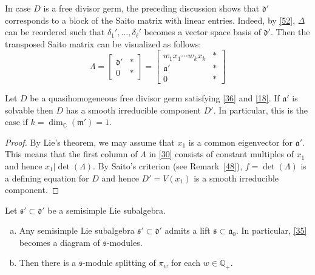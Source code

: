 In case $D$ is a free divisor germ, the preceding discussion shows that ${\mathfrak{d}}'$ corresponds to a block of the Saito matrix with linear entries.
Indeed, by \eqref{52}, $\Delta$ can be reordered such that $\delta_1',\dots,\delta_\ell'$ becomes a vector space basis of ${\mathfrak{d}}'$.
Then the transposed Saito matrix can be visualized as follows:
\begin{equation}\label{30}
\Lambda=
\left[
\begin{array}{c|c}
{\mathfrak{d}}' & * \\
\hline
0 & * 
\end{array}
\right]=
\left[
\begin{array}{c|c}
w_1x_1\cdots w_kx_k & * \\
\hline
{\mathfrak{a}}' & * \\
\hline
0 & * 
\end{array}
\right]
\end{equation}

\begin{prp}\label{31}
Let $D$ be a quasihomogeneous free divisor germ satisfying \eqref{36} and \eqref{18}.
If ${\mathfrak{a}}'$ is solvable then $D$ has a smooth irreducible component $D'$.
In particular, this is the case if $k=\dim_{\mathds{C}}({\mathfrak{m}}')=1$.
\end{prp}

\begin{proof}
By Lie's theorem, we may assume that $x_1$ is a common eigenvector for ${\mathfrak{a}}'$.
This means that the first column of $\Lambda$ in \eqref{30} consists of constant multiples of $x_1$ and hence $x_1\vert\det(\Lambda)$.
By Saito's criterion (see Remark~\ref{48}), $f=\det(\Lambda)$ is a defining equation for $D$ and hence $D'=V(x_1)$ is a smooth irreducible component.
\end{proof}

\begin{lem}\label{32}
Let ${\mathfrak{s}}'\subset{\mathfrak{d}}'$ be a semisimple Lie subalgebra.
\begin{enumerate}[(a)]
\item\label{32a}
Any semisimple Lie subalgebra ${\mathfrak{s}}'\subset{\mathfrak{d}}'$ admits a lift ${\mathfrak{s}}\subset{\mathfrak{a}}_0$.
In particular, \eqref{35} becomes a diagram of ${\mathfrak{s}}$-modules.
\item\label{32b} Then there is a ${\mathfrak{s}}$-module splitting of $\pi_w$ for each $w\in{\mathds{Q}}_+$.
\end{enumerate}
\end{lem}

